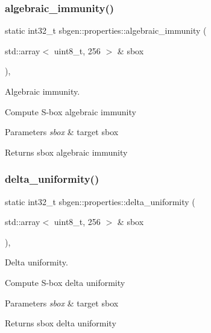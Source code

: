 \subsubsection{\texorpdfstring{algebraic\+\_\+immunity()}{algebraic\_immunity()}}
{\footnotesize\ttfamily static int32\+\_\+t sbgen\+::properties\+::algebraic\+\_\+immunity (\begin{DoxyParamCaption}\item[{std\+::array$<$ uint8\+\_\+t, 256 $>$ \&}]{sbox }\end{DoxyParamCaption})\hspace{0.3cm}{\ttfamily [inline]}, {\ttfamily [static]}}



Algebraic immunity. 

Compute S-\/box algebraic immunity


\begin{DoxyParams}{Parameters}
{\em sbox} & target sbox \\
\hline
\end{DoxyParams}
\begin{DoxyReturn}{Returns}
sbox algebraic immunity 
\end{DoxyReturn}
\mbox{\label{classsbgen_1_1properties_aeb2b1e1face945698d11ae92b7dbd9c9}} 
\subsubsection{\texorpdfstring{delta\+\_\+uniformity()}{delta\_uniformity()}}
{\footnotesize\ttfamily static int32\+\_\+t sbgen\+::properties\+::delta\+\_\+uniformity (\begin{DoxyParamCaption}\item[{std\+::array$<$ uint8\+\_\+t, 256 $>$ \&}]{sbox }\end{DoxyParamCaption})\hspace{0.3cm}{\ttfamily [inline]}, {\ttfamily [static]}}



Delta uniformity. 

Compute S-\/box delta uniformity


\begin{DoxyParams}{Parameters}
{\em sbox} & target sbox \\
\hline
\end{DoxyParams}
\begin{DoxyReturn}{Returns}
sbox delta uniformity 
\end{DoxyReturn}
\mbox{\label{classsbgen_1_1properties_afafede1403d78556e75ae0f0398863bd}} 
